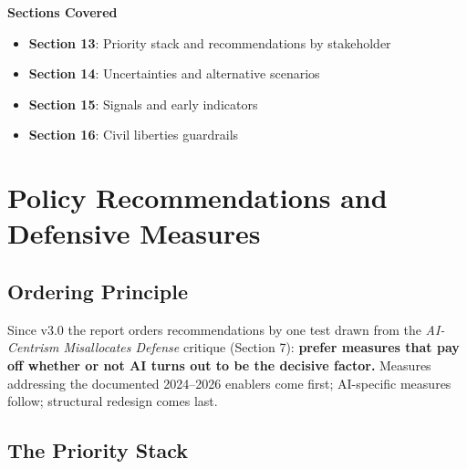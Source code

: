 \documentclass[11pt,letterpaper]{article}
\makeatletter
\newcommand{\etraneed}[1]{\par\if@nobreak\else\penalty\z@\ifdim\pagegoal<\maxdimen\ifdim\dimexpr\pagegoal-\pagetotal\relax<\dimexpr#1\relax\newpage\fi\fi\fi}
\makeatother
\begin{document}
\begin{center}
\begin{minipage}{0.9\textwidth}
\begin{tcolorbox}[enhanced, colback=white, colframe=instblue!30, boxrule=1pt, arc=4pt,
  left=15pt, right=15pt, top=12pt, bottom=12pt]
\textcolor{instdark}{\textbf{Sections Covered}}
\vspace{0.4em}
\begin{itemize}[nosep]
  \item \textbf{Section 13}: Priority stack and recommendations by stakeholder
  \item \textbf{Section 14}: Uncertainties and alternative scenarios
  \item \textbf{Section 15}: Signals and early indicators
  \item \textbf{Section 16}: Civil liberties guardrails
\end{itemize}
\end{tcolorbox}
\end{minipage}
\end{center}

\vspace{0.8cm}

\section{Policy Recommendations and Defensive Measures}

\subsection{Ordering Principle}

Since v3.0 the report orders recommendations by one test drawn from the \textit{AI-Centrism Misallocates Defense} critique (Section 7): \textbf{prefer measures that pay off whether or not AI turns out to be the decisive factor.} Measures addressing the documented 2024--2026 enablers come first; AI-specific measures follow; structural redesign comes last.

\etraneed{0.3\textheight}
\subsection{The Priority Stack}
\end{document}
